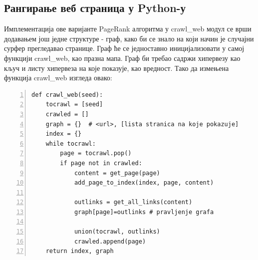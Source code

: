 \documentclass[11pt, serbianc, english, titlepage]{article}
\begin{document}
		\subsection{Рангирање веб страница у Python-у}
		Имплементација ове варијанте PageRank алгоритма у crawl\_web модул се врши додавањем још једне структуре - граф, како би се знало на који начин је случајни сурфер прегледавао странице. Граф ће се једноставно иницијализовати у самој функцији crawl\_web, као празна мапа. Граф би требао садржи хипервезу као кључ и листу хипервеза на које показује, као вредност. Тако да измењена функција crawl\_web изгледа овако:
		\begin{lstlisting}[caption=Увођење графа у crawl\_web, label={lst:graph}, numbers=left]
def crawl_web(seed):
    tocrawl = [seed]
    crawled = []
    graph = {}  # <url>, [lista stranica na koje pokazuje]
    index = {} 
    while tocrawl: 
        page = tocrawl.pop()
        if page not in crawled:
            content = get_page(page)
            add_page_to_index(index, page, content)
            
            outlinks = get_all_links(content)
            graph[page]=outlinks # pravljenje grafa
            
            union(tocrawl, outlinks)
            crawled.append(page)
    return index, graph
		\end{lstlisting}
\end{document}
